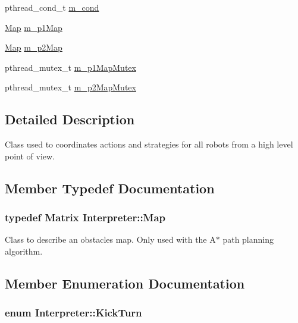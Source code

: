 \begin{DoxyCompactItemize}
\item 
pthread\_\-cond\_\-t \hyperlink{classInterpreter_a9239b5f00f922f05a3902538784f5777}{m\_\-cond}
\item 
\hyperlink{classMatrix}{Map} \hyperlink{classInterpreter_a4c923fac8d283ef70a03812fce74ef47}{m\_\-p1Map}
\item 
\hyperlink{classMatrix}{Map} \hyperlink{classInterpreter_a9704ad86fdf8eddecfe191d8540fb4ef}{m\_\-p2Map}
\item 
pthread\_\-mutex\_\-t \hyperlink{classInterpreter_a849d1195573a32632ae33cd7ecd4bec7}{m\_\-p1MapMutex}
\item 
pthread\_\-mutex\_\-t \hyperlink{classInterpreter_a76012913dbff07096d081b2380c2c7a8}{m\_\-p2MapMutex}
\end{DoxyCompactItemize}


\subsection{Detailed Description}
Class used to coordinates actions and strategies for all robots from a high level point of view. 

\subsection{Member Typedef Documentation}
\hypertarget{classInterpreter_a4c080f069f557cf92dfe803117a6ea53}{
\subsubsection[{Map}]{\setlength{\rightskip}{0pt plus 5cm}typedef {\bf Matrix} {\bf Interpreter::Map}}}
\label{classInterpreter_a4c080f069f557cf92dfe803117a6ea53}


Class to describe an obstacles map. Only used with the A$\ast$ path planning algorithm. 



\subsection{Member Enumeration Documentation}
\hypertarget{classInterpreter_ac7c3ba77d973ffbb84b12db662cfe643}{
\subsubsection[{KickTurn}]{\setlength{\rightskip}{0pt plus 5cm}enum {\bf Interpreter::KickTurn}}}
\label{classInterpreter_ac7c3ba77d973ffbb84b12db662cfe643}


